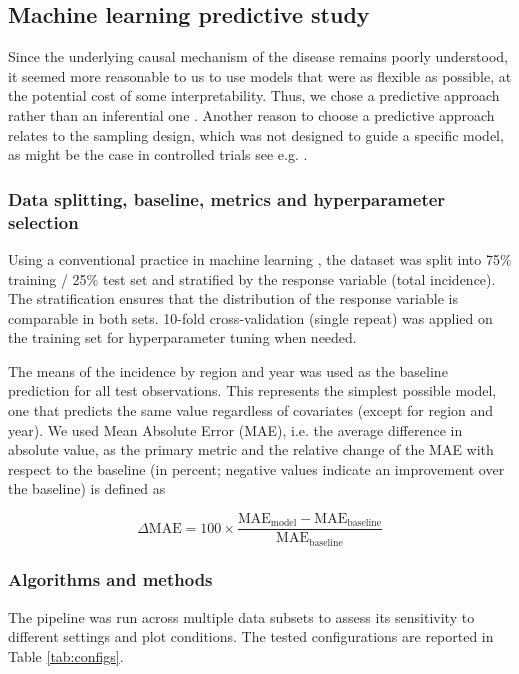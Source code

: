\subsection{Machine learning predictive study}

Since the underlying causal mechanism of the disease remains poorly understood, it seemed more reasonable to us to use models that were as flexible as possible, at the potential cost of some interpretability. Thus, we chose a predictive approach rather than an inferential one \citep{breiman_statistical_2001}. Another reason to choose a predictive approach relates to the sampling design, which was not designed to guide a specific model, as might be the case in controlled trials see e.g. \citep{meier_anova_2022}.

\subsubsection{Data splitting, baseline, metrics and hyperparameter selection}

Using a conventional practice in machine learning \citep{hastie_elements_2009}, the dataset was split into 75\% training / 25\% test set and stratified by the response variable (total incidence). The stratification ensures that the distribution of the response variable is comparable in both sets. 10-fold cross-validation (single repeat) was applied on the training set for hyperparameter tuning when needed.

The means of the incidence by region and year was used as the baseline prediction for all test observations. This represents the simplest possible model, one that predicts the same value regardless of covariates (except for region and year). We used Mean Absolute Error (MAE), i.e. the average difference in absolute value, as the primary metric and the relative change of the MAE with respect to the baseline (in percent; negative values indicate an improvement over the baseline) is defined as

\[
\Delta\mathrm{MAE} = 100 \times \frac{\mathrm{MAE}_{\mathrm{model}} - \mathrm{MAE}_{\mathrm{baseline}}}{\mathrm{MAE}_{\mathrm{baseline}}}
\]

\subsubsection{Algorithms and methods}

The pipeline was run across multiple data subsets to assess its sensitivity to different settings and plot conditions. The tested configurations are reported in Table \ref{tab:configs}.

